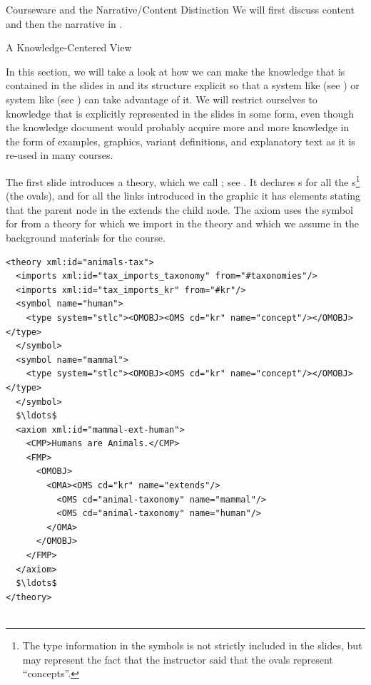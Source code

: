 \begin{tchapter}[id=courseware]{Courseware and the Narrative/Content Distinction}
We will first discuss content {\omdoc} and then the narrative {\omdoc} in
{}.

\begin{tsection}[id=knowledge-centered]{A Knowledge-Centered View}
  
  In this section, we will take a look at how we can make the knowledge that is contained
  in the slides in {} and its structure explicit so that a
  {} system like {\mbase} (see {}) or
  {} system like {\activemath} (see
  {}) can take advantage of it. We will restrict ourselves to
  knowledge that is explicitly represented in the slides in some form, even though the
  knowledge document would probably acquire more and more knowledge in the form of
  examples, graphics, variant definitions, and explanatory text as it is re-used in many
  courses.

The first slide introduces a theory, which we call {}; see
{}.  It declares {s} for all the
{s}\footnote{The type information in the symbols is not strictly
  included in the slides, but may represent the fact that the instructor said that
  the ovals represent ``concepts''.}  (the ovals), and for all the links
introduced in the graphic it has {} elements stating that the
parent node in the {} extends the child node. The axiom uses the
symbol for {} from a theory {} for
{} which we import in the theory and which we
assume in the background materials for the course.

\begin{lstlisting}[label=lst:ann-tax,mathescape,
    caption={The {\omdoc} Representation for Slide 1 from {\myfigref{15-211}}},
    index={theory,axiom,symbol,CMP,FMP,OMA,OMOBJ,OMS,private,data}]
<theory xml:id="animals-tax">
  <imports xml:id="tax_imports_taxonomy" from="#taxonomies"/>
  <imports xml:id="tax_imports_kr" from="#kr"/>
  <symbol name="human">
    <type system="stlc"><OMOBJ><OMS cd="kr" name="concept"/></OMOBJ></type>
  </symbol>
  <symbol name="mammal">
    <type system="stlc"><OMOBJ><OMS cd="kr" name="concept"/></OMOBJ></type>
  </symbol>
  $\ldots$
  <axiom xml:id="mammal-ext-human">
    <CMP>Humans are Animals.</CMP>
    <FMP>
      <OMOBJ>
        <OMA><OMS cd="kr" name="extends"/>
          <OMS cd="animal-taxonomy" name="mammal"/>
          <OMS cd="animal-taxonomy" name="human"/>
        </OMA>
      </OMOBJ>
    </FMP>
  </axiom>
  $\ldots$
</theory>


\end{lstlisting}
\end{tsection}
\end{tchapter}
